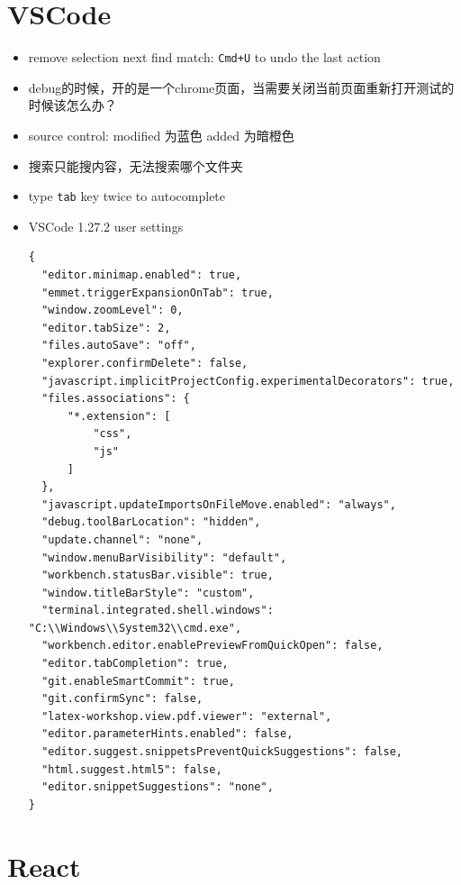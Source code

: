 \documentclass[a4paper, 12pt]{article}
\begin{document}
\section{VSCode}
\begin{itemize}

\item remove selection next find match: \verb|Cmd+U| to undo the last action

\item debug的时候，开的是一个chrome页面，当需要关闭当前页面重新打开测试的时候该怎么办？

\item source control: modified 为蓝色 \quad added 为暗橙色

\item 搜索只能搜内容，无法搜索哪个文件夹

\item type \verb|tab| key twice to autocomplete

\item VSCode 1.27.2 user settings
\begin{verbatim}
{
  "editor.minimap.enabled": true,
  "emmet.triggerExpansionOnTab": true,
  "window.zoomLevel": 0,
  "editor.tabSize": 2,
  "files.autoSave": "off",
  "explorer.confirmDelete": false,
  "javascript.implicitProjectConfig.experimentalDecorators": true,
  "files.associations": {
      "*.extension": [
          "css",
          "js"
      ]
  },
  "javascript.updateImportsOnFileMove.enabled": "always",
  "debug.toolBarLocation": "hidden",
  "update.channel": "none",
  "window.menuBarVisibility": "default",
  "workbench.statusBar.visible": true,
  "window.titleBarStyle": "custom",
  "terminal.integrated.shell.windows": "C:\\Windows\\System32\\cmd.exe",
  "workbench.editor.enablePreviewFromQuickOpen": false,
  "editor.tabCompletion": true,
  "git.enableSmartCommit": true,
  "git.confirmSync": false,
  "latex-workshop.view.pdf.viewer": "external",
  "editor.parameterHints.enabled": false,
  "editor.suggest.snippetsPreventQuickSuggestions": false,
  "html.suggest.html5": false,
  "editor.snippetSuggestions": "none",
}
\end{verbatim}
\end{itemize}


\section{React}
\end{document}
